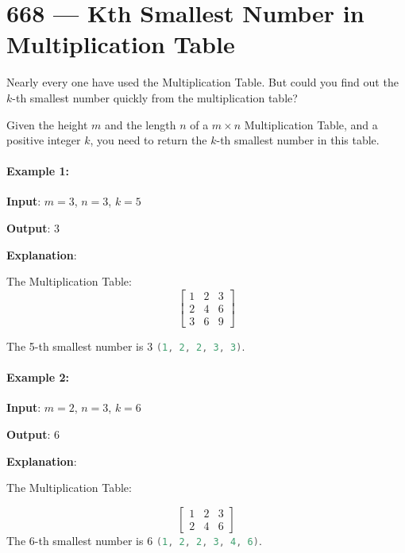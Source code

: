 \section{668 --- Kth Smallest Number in Multiplication Table}
Nearly every one have used the Multiplication Table. But could you find out the $k$-th smallest number quickly from the multiplication table?

Given the height $m$ and the length $n$ of a $m \times n$ Multiplication Table, and a positive integer $k$, you need to return the $k$-th smallest number in this table.

\paragraph{Example 1:}

\begin{flushleft}

\textbf{Input}: $m = 3$, $n = 3$, $k = 5$

\textbf{Output}: 3

\textbf{Explanation}: 

The Multiplication Table:
\[
\begin{bmatrix}
1 & 2 & 3 \\
2 & 4 & 6 \\
3 & 6 & 9
\end{bmatrix}
\]

The 5-th smallest number is 3 \lstinline[language=C++, basicstyle=\small\ttfamily, keywordstyle=\bfseries\color{green!40!black}]|(1, 2, 2, 3, 3)|.

\end{flushleft}

\paragraph{Example 2:}

\begin{flushleft}

\textbf{Input}: $m = 2$, $n = 3$, $k = 6$

\textbf{Output}: 6

\textbf{Explanation}: 

The Multiplication Table:

\[
\begin{bmatrix}
1 & 2 & 3 \\
2 & 4 & 6
\end{bmatrix}
\]
The 6-th smallest number is 6 \lstinline[language=C++, basicstyle=\small\ttfamily, keywordstyle=\bfseries\color{green!40!black}]|(1, 2, 2, 3, 4, 6)|.

\end{flushleft}

